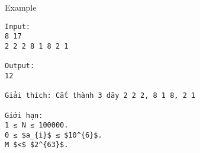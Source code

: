 Example
\begin{verbatim}
Input:
8 17
2 2 2 8 1 8 2 1

Output:
12

Giải thích: Cắt thành 3 dãy 2 2 2, 8 1 8, 2 1

Giới hạn:
1 ≤ N ≤ 100000.
0 ≤ $a_{i}$ ≤ $10^{6}$.
M $<$ $2^{63}$.

\end{verbatim}